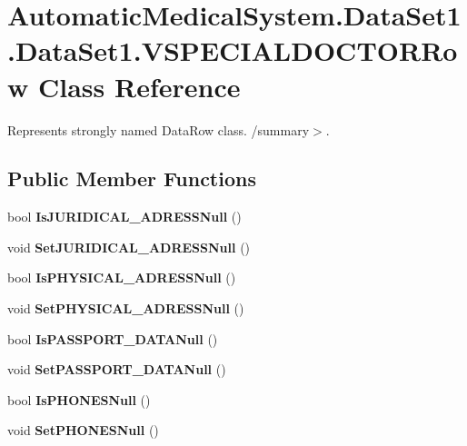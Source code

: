 \section{AutomaticMedicalSystem.DataSet1.DataSet1.VSPECIALDOCTORRow Class Reference}
\label{class_automatic_medical_system_1_1_data_set1_1_1_v_s_p_e_c_i_a_l_d_o_c_t_o_r_row}
Represents strongly named DataRow class. /summary$>$.  


\subsection*{Public Member Functions}
\begin{CompactItemize}
\item 
bool \textbf{IsJURIDICAL\_\-ADRESSNull} ()\label{class_automatic_medical_system_1_1_data_set1_1_1_v_s_p_e_c_i_a_l_d_o_c_t_o_r_row_712829ffb9d80ac6ed8c0c2ecbafa4bc}

\item 
void \textbf{SetJURIDICAL\_\-ADRESSNull} ()\label{class_automatic_medical_system_1_1_data_set1_1_1_v_s_p_e_c_i_a_l_d_o_c_t_o_r_row_738b49e5946c9558c0a7b2f461fe5903}

\item 
bool \textbf{IsPHYSICAL\_\-ADRESSNull} ()\label{class_automatic_medical_system_1_1_data_set1_1_1_v_s_p_e_c_i_a_l_d_o_c_t_o_r_row_b7e01672ec1496cf60f5a70df8e7e498}

\item 
void \textbf{SetPHYSICAL\_\-ADRESSNull} ()\label{class_automatic_medical_system_1_1_data_set1_1_1_v_s_p_e_c_i_a_l_d_o_c_t_o_r_row_1ec0d5d11316be57d7abfd144449667a}

\item 
bool \textbf{IsPASSPORT\_\-DATANull} ()\label{class_automatic_medical_system_1_1_data_set1_1_1_v_s_p_e_c_i_a_l_d_o_c_t_o_r_row_18ec4a9a634fd5d6e27d2aec46ae3c82}

\item 
void \textbf{SetPASSPORT\_\-DATANull} ()\label{class_automatic_medical_system_1_1_data_set1_1_1_v_s_p_e_c_i_a_l_d_o_c_t_o_r_row_4d3536a54db16d9100dd60412c60d40a}

\item 
bool \textbf{IsPHONESNull} ()\label{class_automatic_medical_system_1_1_data_set1_1_1_v_s_p_e_c_i_a_l_d_o_c_t_o_r_row_7d83441741799470976823479d429a1e}

\item 
void \textbf{SetPHONESNull} ()\label{class_automatic_medical_system_1_1_data_set1_1_1_v_s_p_e_c_i_a_l_d_o_c_t_o_r_row_79189a0feb3e1c2be020275650bf5b08}


\end{CompactItemize}
